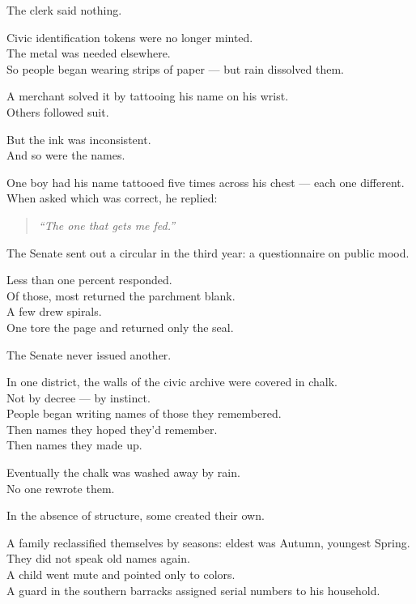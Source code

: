 \documentclass[12pt]{article}
\begin{document}
The clerk said nothing.

\vspace{1em}

Civic identification tokens were no longer minted.\\
The metal was needed elsewhere.\\
So people began wearing strips of paper — but rain dissolved them.

A merchant solved it by tattooing his name on his wrist.\\
Others followed suit.

But the ink was inconsistent.\\
And so were the names.

One boy had his name tattooed five times across his chest — each one different.\\
When asked which was correct, he replied:

\begin{quote}
\textit{“The one that gets me fed.”}
\end{quote}

\vspace{1em}

The Senate sent out a circular in the third year: a questionnaire on public mood.

Less than one percent responded.\\
Of those, most returned the parchment blank.\\
A few drew spirals.\\
One tore the page and returned only the seal.

The Senate never issued another.

\vspace{1em}

In one district, the walls of the civic archive were covered in chalk.\\
Not by decree — by instinct.\\
People began writing names of those they remembered.\\
Then names they hoped they’d remember.\\
Then names they made up.

Eventually the chalk was washed away by rain.\\
No one rewrote them.

\vspace{1em}

In the absence of structure, some created their own.

A family reclassified themselves by seasons: eldest was Autumn, youngest Spring.\\
They did not speak old names again.\\
A child went mute and pointed only to colors.\\
A guard in the southern barracks assigned serial numbers to his household.
\end{document}
